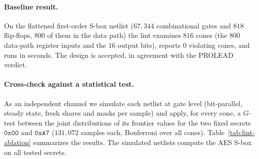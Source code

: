 \documentclass[lettersize,journal]{IEEEtran}
\begin{document}
\paragraph{Baseline result.} On the flattened first-order S-box netlist
($67{,}344$ combinational gates and $818$ flip-flops, $800$ of them in the data
path) the lint examines $816$ cones (the $800$ data-path register inputs and
the $16$ output bits), reports $0$ violating cones, and runs in seconds. The
design is accepted, in agreement with the PROLEAD verdict.

\paragraph{Cross-check against a statistical test.} As an independent channel
we simulate each netlist at gate level (bit-parallel, steady state, fresh shares
and masks per sample) and apply, for every cone, a $G$-test between the joint
distributions of its frontier values for the two fixed secrets $\mathtt{0x00}$
and $\mathtt{0xA7}$ ($131{,}072$ samples each, Bonferroni over all cones).
Table~\ref{tab:lint-ablation} summarizes the results. The simulated netlists
compute the AES S-box on all tested secrets.

\begin{table}[t]
\centering
\caption{Lint verdicts against a gate-level statistical test. Lint: flagged
register-input cones / flagged output bits. Test: cones with
$-\log_{10}p$ above the Bonferroni threshold. PROLEAD column: probing sets
flagged. Variants A and C are graph rewrites of the final netlist.}
\label{tab:lint-ablation}
\end{table}
\end{document}
